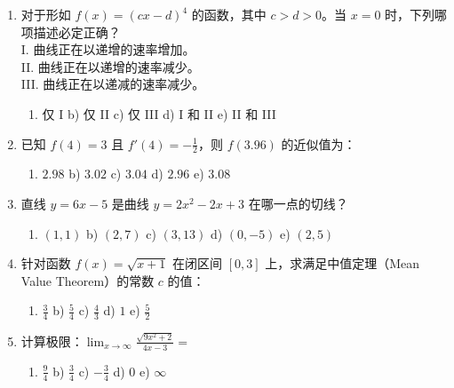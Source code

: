 \documentclass[12pt,a4paper]{article}
\begin{document}
\begin{enumerate}[label=\arabic*), itemsep=15pt]
    \item 对于形如 $f(x) = (cx-d)^4$ 的函数，其中 $c > d > 0$。当 $x=0$ 时，下列哪项描述必定正确？\\
    I. 曲线正在以递增的速率增加。\\
    II. 曲线正在以递增的速率减少。\\
    III. 曲线正在以递减的速率减少。
    \begin{enumerate}[label=\alph*), itemsep=0pt]
        \item 仅 I \quad b) 仅 II \quad c) 仅 III \quad d) I 和 II \quad e) II 和 III
    \end{enumerate}

    \item 已知 $f(4) = 3$ 且 $f'(4) = -\frac{1}{2}$，则 $f(3.96)$ 的近似值为：
    \begin{enumerate}[label=\alph*), itemsep=0pt]
        \item $2.98$ \quad b) $3.02$ \quad c) $3.04$ \quad d) $2.96$ \quad e) $3.08$
    \end{enumerate}

    \item 直线 $y = 6x - 5$ 是曲线 $y = 2x^2 - 2x + 3$ 在哪一点的切线？
    \begin{enumerate}[label=\alph*), itemsep=0pt]
        \item $(1, 1)$ \quad b) $(2, 7)$ \quad c) $(3, 13)$ \quad d) $(0, -5)$ \quad e) $(2, 5)$
    \end{enumerate}

    \item 针对函数 $f(x) = \sqrt{x+1}$ 在闭区间 $[0, 3]$ 上，求满足中值定理（Mean Value Theorem）的常数 $c$ 的值：
    \begin{enumerate}[label=\alph*), itemsep=0pt]
        \item $\frac{3}{4}$ \quad b) $\frac{5}{4}$ \quad c) $\frac{4}{3}$ \quad d) $1$ \quad e) $\frac{5}{2}$
    \end{enumerate}

    \item 计算极限：$\lim_{x \rightarrow \infty} \frac{\sqrt{9x^2 + 2}}{4x - 3} =$
    \begin{enumerate}[label=\alph*), itemsep=0pt]
        \item $\frac{9}{4}$ \quad b) $\frac{3}{4}$ \quad c) $-\frac{3}{4}$ \quad d) $0$ \quad e) $\infty$
    \end{enumerate}


\end{enumerate}
\end{document}
